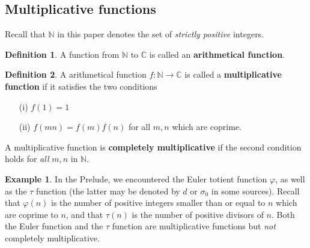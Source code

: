\documentclass[a4paper]{article}
\theoremstyle{definition}
\newtheorem{definition}{Definition}[section]
\newtheorem{example}{Example}[section]
\theoremstyle{remark}
\newcommand{\N}{\mathbb{N}}
\newcommand{\C}{\mathbb{C}}
\newcommand{\defhl}[1]{\textbf{#1}}
\begin{document}
\subsection{Multiplicative functions}

Recall that $\N$ in this paper denotes the set of \emph{strictly positive} integers.

\begin{definition}
A function from $\N$ to $\C$ is called an \defhl{arithmetical function}.
\end{definition}

\begin{definition} \label{def:multiplicative}
A arithmetical function $f: \mathbb{N} \to \mathbb{C}$ is called a \defhl{multiplicative function} if it satisfies the two conditions
\begin{itemize}
\item[(i)] $f(1) = 1$
\item[(ii)] $f(mn) = f(m) f(n)$ for all $m, n$ which are coprime.
\end{itemize}
A multiplicative function is \defhl{completely multiplicative} if the second condition holds for \emph{all} $m, n$ in $\N$. 

\end{definition}



\begin{example}
In the Prelude, we encountered the Euler totient function $\varphi$, as well as the $\tau$ function (the latter may be denoted by $d$ or $\sigma_0$ in some sources). Recall that $\varphi(n)$ is the number of positive integers smaller than or equal to $n$ which are coprime to $n$, and that $\tau(n)$ is the number of positive divisors of $n$. Both the Euler function and the $\tau$ function are multiplicative functions but \emph{not} completely multiplicative.
\end{example}
\end{document}
